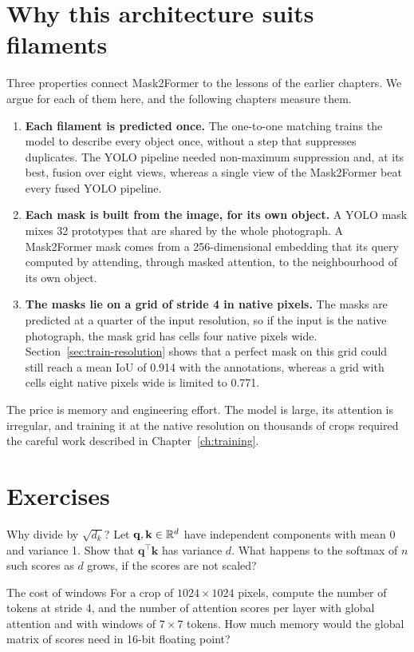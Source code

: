 \section{Why this architecture suits filaments}\label{sec:tr-why}
Three properties connect Mask2Former to the lessons of the earlier chapters. We argue for each of
them here, and the following chapters measure them.
\begin{enumerate}[leftmargin=*,itemsep=2pt]
\item \textbf{Each filament is predicted once.} The one-to-one matching trains the model to describe
every object once, without a step that suppresses duplicates. The YOLO pipeline needed non-maximum
suppression and, at its best, fusion over eight views, whereas a single view of the Mask2Former beat
every fused YOLO pipeline.
\item \textbf{Each mask is built from the image, for its own object.} A YOLO mask mixes 32 prototypes
that are shared by the whole photograph. A Mask2Former mask comes from a 256-dimensional embedding that
its query computed by attending, through masked attention, to the neighbourhood of its own object.
\item \textbf{The masks lie on a grid of stride 4 in native pixels.} The masks are predicted at a
quarter of the input resolution, so if the input is the native photograph, the mask grid has cells
four native pixels wide. Section~\ref{sec:train-resolution} shows that a perfect mask on this grid
could still reach a mean IoU of 0.914 with the annotations, whereas a grid with cells eight native
pixels wide is limited to 0.771.
\end{enumerate}
The price is memory and engineering effort. The model is large, its attention is irregular, and
training it at the native resolution on thousands of crops required the careful work described in
Chapter~\ref{ch:training}.

\section*{Exercises}
\begin{exercise}{Why divide by $\sqrt{d_k}$?}\label{ex:tr-sqrt}
Let $\mathbf{q},\mathbf{k}\in\mathbb{R}^{d}$ have independent components with mean 0 and variance 1. Show that
$\mathbf{q}^{\top}\mathbf{k}$ has variance $d$. What happens to the softmax of $n$ such scores as $d$
grows, if the scores are not scaled?
\end{exercise}

\begin{exercise}{The cost of windows}
For a crop of $1024\times1024$ pixels, compute the number of tokens at stride 4, and the number of
attention scores per layer with global attention and with windows of $7\times7$ tokens. How much memory
would the global matrix of scores need in 16-bit floating point?
\end{exercise}


